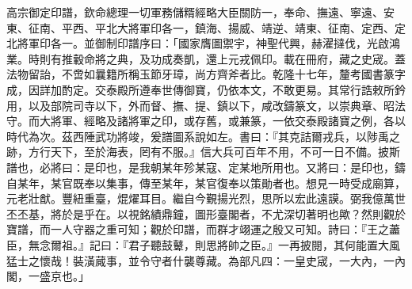\begin{pinyinscope}
高宗御定印譜，欽命總理一切軍務儲糈經略大臣關防一，奉命、撫遠、寧遠、安東、征南、平西、平北大將軍印各一，鎮海、揚威、靖逆、靖東、征南、定西、定北將軍印各一。並御制印譜序曰：「國家膺圖禦宇，神聖代興，赫濯撻伐，光啟鴻業。時則有推轂命將之典，及功成奏凱，還上元戎佩印。載在冊府，藏之史宬。蓋法物留詒，不啻如曩籍所稱玉節牙璋，尚方齊斧者比。乾隆十七年，釐考國書篆字成，因詳加酌定。交泰殿所遵奉世傳御寶，仍依本文，不敢更易。其常行誥敕所鈐用，以及部院司寺以下，外而督、撫、提、鎮以下，咸改鑄篆文，以崇典章、昭法守。而大將軍、經略及諸將軍之印，或存舊，或兼篆，一依交泰殿諸寶之例，各以時代為次。茲西陲武功將竣，爰譜圖系說如左。書曰：『其克詰爾戎兵，以陟禹之跡，方行天下，至於海表，罔有不服。』信大兵可百年不用，不可一日不備。披斯譜也，必將曰：是印也，是我朝某年殄某寇、定某地所用也。又將曰：是印也，鑄自某年，某官既奉以集事，傳至某年，某官復奉以策勛者也。想見一時受成廟算，元老壯猷。豐紐重臺，焜燿耳目。繼自今覲揚光烈，思所以宏此遠謨。弼我億萬世丕丕基，將於是乎在。以視銘績鼎鐘，圖形臺閣者，不尤深切著明也歟？然則觀於寶譜，而一人守器之重可知；觀於印譜，而群才翊運之殷又可知。詩曰：『王之藎臣，無念爾祖。』記曰：『君子聽鼓鼙，則思將帥之臣。』一再披閱，其何能置大風猛士之懷哉！裝潢蕆事，並令守者什襲尊藏。為部凡四：一皇史宬，一大內，一內閣，一盛京也。」


\end{pinyinscope}